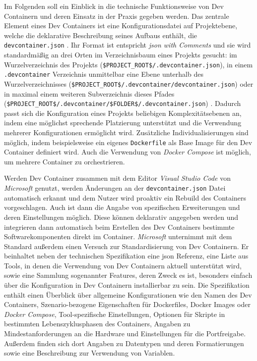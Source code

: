 Im Folgenden soll ein Einblick in die technische Funktionsweise von Dev Containern und deren Einsatz in der Praxis gegeben werden. Das zentrale Element eines Dev Containers ist eine Konfigurationsdatei auf Projektebene, welche die deklarative Beschreibung seines Aufbaus enthält, die \texttt{devcontainer.json} \cite{202:Maximizing-Efficiency-with-Dev-Containers}. Ihr Format ist entspricht \textit{\Gls{json} with Comments} und sie wird standardmäßig an drei Orten im Verzeichnisbaum eines Projekts gesucht: im Wurzelverzeichnis des Projekts (\texttt{\$PROJECT\_ROOT\$/.devcontainer.json}), in einem \texttt{.devcontainer} Verzeichnis unmittelbar eine Ebene unterhalb des Wurzelverzeichnisses (\texttt{\$PROJECT\_ROOT\$/.devcontainer/devcontainer.json}) oder in maximal einem weiteren Subverzeichnis dieses Pfades (\texttt{\$PROJECT\_ROOT\$/.devcontainer/\$FOLDER\$/.devcontainer.json}) \cite{204:Development-Containers-Simplified,303:Introduction-to-DevContainers,305:Using-DevContainers-in-JetBrains-IDEs}. Dadurch passt sich die Konfiguration eines Projekts beliebigen Komplexitätsebenen an, indem eine möglichst sprechende Platzierung unterstützt und die Verwendung mehrerer Konfigurationen ermöglicht wird. Zusätzliche Individualisierungen sind möglich, indem beispielsweise ein eigenes \texttt{Dockerfile} als Base Image für den Dev Container definiert wird. Auch die Verwendung von \textit{Docker Compose} ist möglich, um mehrere Container zu orchestrieren. \cite{202:Maximizing-Efficiency-with-Dev-Containers}

Werden Dev Container zusammen mit dem Editor \textit{Visual Studio Code} von \textit{Microsoft} genutzt, werden Änderungen an der \texttt{devcontainer.json} Datei automatisch erkannt und dem Nutzer wird proaktiv ein Rebuild des Containers vorgeschlagen. Auch ist dann die Angabe von spezifischen Erweiterungen und deren Einstellungen möglich. Diese können deklarativ angegeben werden und integrieren dann automatisch beim Erstellen des Dev Containers bestimmte Softwarekomponenten direkt im Container. \cite{201:How-to-develop-with-Dev-Containers} \textit{Microsoft} unternimmt mit dem  Standard außerdem einen Versuch zur Standardisierung von Dev Containern. Er beinhaltet neben der technischen Spezifikation eine \Gls{json} Referenz, eine Liste aus Tools, in denen die Verwendung von Dev Containern aktuell unterstützt wird, sowie eine Sammlung sogenannter Features, deren Zweck es ist, besonders einfach über die Konfiguration in Dev Containern installierbar zu sein. Die Spezifikation enthält einen Überblick über allgemeine Konfigurationen wie den Namen des Dev Containers, Szenario-bezogene Eigenschaften für Dockerfiles, Docker Images oder \textit{Docker Compose}, Tool-spezifische Einstellungen, Optionen für Skripte in bestimmten Lebenszyklusphasen des Containers, Angaben zu Mindestanforderungen an die Hardware und Einstellungen für die Portfreigabe. Außerdem finden sich dort Angaben zu Datentypen und deren Formatierungen sowie eine Beschreibung zur Verwendung von Variablen. \cite{306:Development-Containers}

